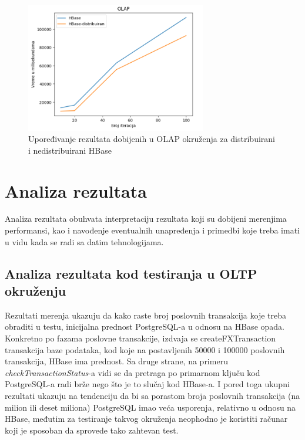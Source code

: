 \documentclass[12pt,oneside]{memoir}
\begin{document}
\begin{figure}[!ht]
  \centering
  \includegraphics[width=0.7\textwidth]{dist-olap.png}
  \caption{Upoređivanje rezultata dobijenih u OLAP okruženja za distribuirani i nedistribuirani HBase }
  \label{fig:grafikon}
\end{figure}



\chapter{Analiza rezultata}

Analiza rezultata obuhvata interpretaciju rezultata koji su dobijeni merenjima performansi, kao i navođenje eventualnih unapređenja i primedbi koje treba imati u vidu kada se radi sa datim tehnologijama.

\section{Analiza rezultata kod testiranja u OLTP okruženju}

Rezultati merenja ukazuju da kako raste broj poslovnih transakcija koje treba obraditi u testu, inicijalna prednost PostgreSQL-a u odnosu na HBase opada. Konkretno po fazama poslovne transakcije, izdvaja se createFXTransaction transakcija baze podataka, kod koje na postavljenih 50000 i 100000  poslovnih transakcija, HBase ima prednost. Sa druge strane, na primeru \textit{checkTransactionStatus}-a vidi se da pretraga po primarnom ključu kod PostgreSQL-a radi brže nego što je to slučaj kod HBase-a.  I pored toga ukupni rezultati ukazuju na tendenciju da bi sa porastom broja poslovnih transakcija (na milion ili deset miliona) PostgreSQL imao veća usporenja, relativno u odnosu na HBase, međutim za testiranje takvog okruženja neophodno je koristiti računar koji je sposoban da sprovede tako zahtevan test.
\end{document}
